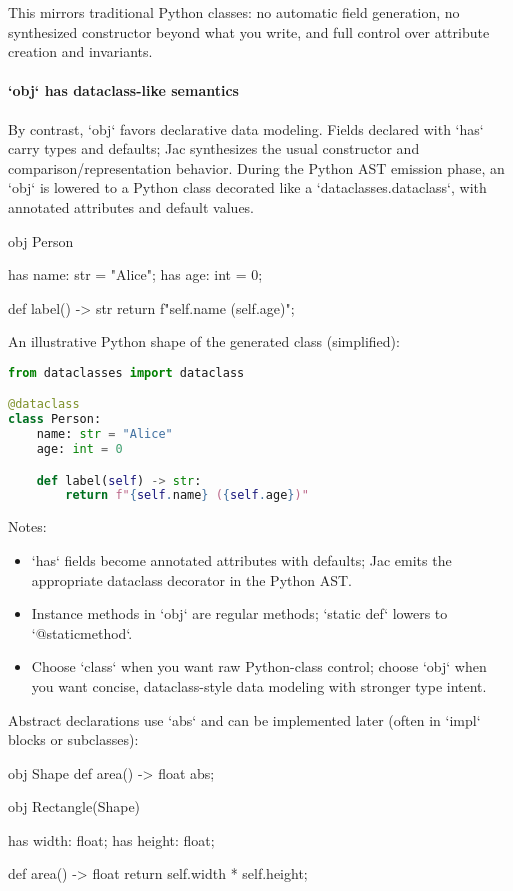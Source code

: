 This mirrors traditional Python classes: no automatic field generation, no synthesized constructor beyond what you write, and full control over attribute creation and invariants.

\paragraph{`obj` has dataclass-like semantics}

By contrast, `obj` favors declarative data modeling. Fields declared with `has` carry types and defaults; Jac synthesizes the usual constructor and comparison/representation behavior. During the Python AST emission phase, an `obj` is lowered to a Python class decorated like a `dataclasses.dataclass`, with annotated attributes and default values.

\begin{jacblock}
obj Person {
    has name: str = "Alice";
    has age: int = 0;

    def label() -> str { return f"{self.name} ({self.age})"; }
}
\end{jacblock}

An illustrative Python shape of the generated class (simplified):

\begin{lstlisting}[language=Python]
from dataclasses import dataclass

@dataclass
class Person:
    name: str = "Alice"
    age: int = 0

    def label(self) -> str:
        return f"{self.name} ({self.age})"
\end{lstlisting}

Notes:
\begin{itemize}
    \item `has` fields become annotated attributes with defaults; Jac emits the appropriate dataclass decorator in the Python AST.
    \item Instance methods in `obj` are regular methods; `static def` lowers to `@staticmethod`.
    \item Choose `class` when you want raw Python-class control; choose `obj` when you want concise, dataclass-style data modeling with stronger type intent.
\end{itemize}

Abstract declarations use `abs` and can be implemented later (often in `impl` blocks or subclasses):

\begin{jacblock}
obj Shape {
    def area() -> float abs;
}

obj Rectangle(Shape) {
    has width: float;
    has height: float;

    def area() -> float { return self.width * self.height; }
}
\end{jacblock}

